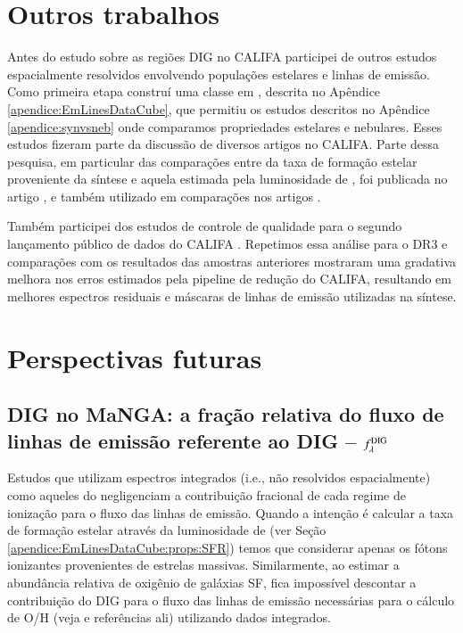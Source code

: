 \section{Outros trabalhos}
\label{sec:concl:other}

Antes do estudo sobre as regiões DIG no CALIFA participei de outros estudos espacialmente resolvidos envolvendo populações estelares e linhas de emissão. Como primeira etapa construí uma classe em \pyt, descrita no Apêndice \ref{apendice:EmLinesDataCube}, que permitiu os estudos descritos no Apêndice \ref{apendice:synvsneb} onde comparamos propriedades estelares e nebulares. Esses estudos fizeram parte da discussão de diversos artigos no CALIFA. Parte dessa pesquisa, em particular das comparações entre da taxa de formação estelar proveniente da síntese e aquela estimada pela luminosidade de \Ha, foi publicada no artigo \citep{GonzalezDelgado.etal.2016a}, e também utilizado em comparações nos artigos \citet{CortijoFerrero.etal.2017a, CortijoFerrero.etal.2017b, CortijoFerrero.etal.2017c}.

Também participei dos estudos de controle de qualidade para o segundo lançamento público de dados do CALIFA  \citet[DR2; ][Apêndice \ref{apendice:GBetal2015a}]{GarciaBenito.etal.2015a}. Repetimos essa análise para o DR3 e comparações com os resultados das amostras anteriores mostraram uma gradativa melhora nos erros estimados pela pipeline de redução do CALIFA, resultando em melhores espectros residuais e máscaras de linhas de emissão utilizadas na síntese.


\section{Perspectivas futuras}
\label{sec:concl:futIFS}

\subsection{DIG no MaNGA: a fração relativa do fluxo de linhas de emissão referente ao DIG -- $f_\lambda^{\rm DIG}$}
\label{sec:concl:futIFS:DIGMaNGA}
Estudos que utilizam espectros integrados (i.e., não resolvidos espacialmente) como aqueles do \SDSS negligenciam a contribuição fracional de cada regime de ionização para o fluxo das linhas de emissão. Quando a intenção é calcular a taxa de formação estelar através da luminosidade de \Ha (ver Seção \ref{apendice:EmLinesDataCube:props:SFR}) temos que considerar apenas os fótons ionizantes provenientes de estrelas massivas. Similarmente, ao estimar a abundância relativa de oxigênio de galáxias SF, fica impossível descontar a contribuição do DIG para o fluxo das linhas de emissão necessárias para o cálculo de O/H (veja \citealt{Sanders.etal.2017a} e referências ali) utilizando dados integrados.

